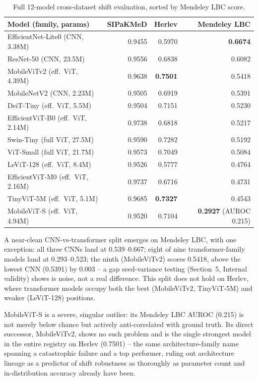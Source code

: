\documentclass[runningheads]{llncs}
\begin{document}
\begin{table}[htbp]
\centering
\caption{Full 12-model cross-dataset shift evaluation, sorted by Mendeley LBC score.}
\label{tab:rq4-full}
\begin{tabular}{lrrr}
\toprule
Model (family, params) & SIPaKMeD & Herlev & Mendeley LBC \\
\midrule
EfficientNet-Lite0 (CNN, 3.38M) & 0.9455 & 0.5970 & \textbf{0.6674} \\
ResNet-50 (CNN, 23.5M) & 0.9556 & 0.6838 & 0.6082 \\
MobileViTv2 (eff.\ ViT, 4.39M) & 0.9638 & \textbf{0.7501} & 0.5418 \\
MobileNetV2 (CNN, 2.23M) & 0.9505 & 0.6919 & 0.5391 \\
DeiT-Tiny (eff.\ ViT, 5.5M) & 0.9504 & 0.7151 & 0.5230 \\
EfficientViT-B0 (eff.\ ViT, 2.14M) & 0.9738 & 0.6818 & 0.5217 \\
Swin-Tiny (full ViT, 27.5M) & 0.9590 & 0.7282 & 0.5192 \\
ViT-Small (full ViT, 21.7M) & 0.9573 & 0.7049 & 0.5084 \\
LeViT-128 (eff.\ ViT, 8.4M) & 0.9526 & 0.5777 & 0.4764 \\
EfficientViT-M0 (eff.\ ViT, 2.16M) & 0.9737 & 0.6716 & 0.4731 \\
TinyViT-5M (eff.\ ViT, 5.1M) & 0.9685 & \textbf{0.7327} & 0.4543 \\
MobileViT-S (eff.\ ViT, 4.94M) & 0.9520 & 0.7104 & \textbf{0.2927} (AUROC 0.215) \\
\bottomrule
\end{tabular}
\end{table}

A near-clean CNN-vs-transformer split emerges on Mendeley LBC, with one
exception: all three CNNs land at 0.539--0.667; eight of nine
transformer-family models land at 0.293--0.523; the ninth (MobileViTv2)
scores 0.5418, above the lowest CNN (0.5391) by 0.003 -- a gap
seed-variance testing (Section~5, Internal validity) shows is noise, not
a real difference. This split does not hold on Herlev, where transformer
models occupy both the best (MobileViTv2, TinyViT-5M) and weaker
(LeViT-128) positions.

MobileViT-S is a severe, singular outlier: its Mendeley LBC AUROC (0.215)
is not merely below chance but actively anti-correlated with ground
truth. Its direct successor, MobileViTv2, shows no such problem and is the
single strongest model in the entire registry on Herlev (0.7501) -- the
same architecture-family name spanning a catastrophic failure and a top
performer, ruling out architecture lineage as a predictor of shift
robustness as thoroughly as parameter count and in-distribution accuracy
already have been.
\end{document}
